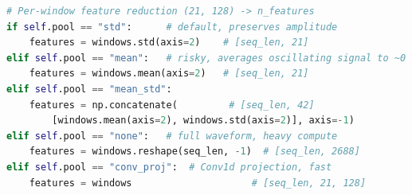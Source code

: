 \documentclass[11pt,a4paper]{article}
\begin{document}
\begin{lstlisting}[language=Python, caption={LSTM Pooling Options}, label=lst:lstm_pool]
# Per-window feature reduction (21, 128) -> n_features
if self.pool == "std":      # default, preserves amplitude
    features = windows.std(axis=2)    # [seq_len, 21]
elif self.pool == "mean":   # risky, averages oscillating signal to ~0
    features = windows.mean(axis=2)   # [seq_len, 21]
elif self.pool == "mean_std":
    features = np.concatenate(         # [seq_len, 42]
        [windows.mean(axis=2), windows.std(axis=2)], axis=-1)
elif self.pool == "none":   # full waveform, heavy compute
    features = windows.reshape(seq_len, -1)  # [seq_len, 2688]
elif self.pool == "conv_proj":  # Conv1d projection, fast
    features = windows                     # [seq_len, 21, 128]
\end{lstlisting}
\end{document}
